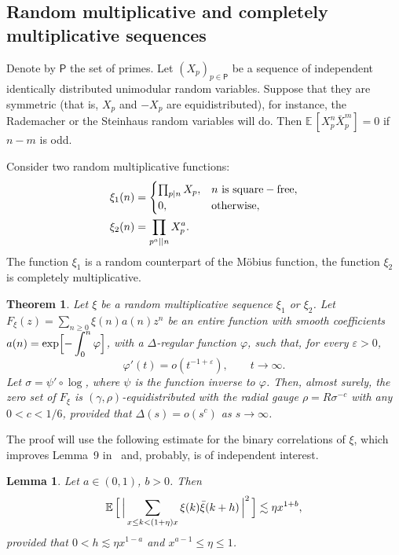 \documentclass[11pt]{amsart}
\numberwithin{equation}{section}
\newtheorem{theorem}{Theorem}
\newtheorem{lemma}{Lemma}[section]
\def\ep{{\varepsilon}}
\newcommand{\bE}{\mathbb E}
\begin{document}
\subsection{Random multiplicative and completely multiplicative sequen\-ces}

Denote by $\mathsf P$ the set of primes.
Let $(X_p)_{p\in\mathsf P}$ be a sequence of independent identically distributed
unimodular random variables. Suppose that they are symmetric (that is,
$X_p$ and $-X_p$ are equidistributed), for instance, the Rademacher or the Steinhaus random variables will do. Then $\bE\,[X_p^n\bar X_p^m]=0$ if $n-m$ is odd.

Consider two random multiplicative functions:
\begin{align*}
\xi_1(n)&=
\begin{cases}
\prod_{p|n}X_p, & n {\rm\ is\ square-free},\\
0, & {\rm otherwise},
\end{cases} \\
\xi_2(n)&=\prod_{p^a||n}X^a_p.
\end{align*}
The function $\xi_1$ is a random counterpart of the M\"obius function,
the function $\xi_2$ is completely multiplicative.

\begin{theorem}\label{thm:random-multiplicative}
Let $\xi$ be a random multiplicative sequence $\xi_1$ or $\xi_2$.
Let $F_\xi (z) = \sum_{n\ge 0} \xi(n) a(n) z^n $ be an entire function with smooth
coefficients $a(n) = \exp\Bigl[ -\displaystyle \int_0^n \varphi \Bigr]$, with
a $\Delta$-regular function $\varphi$, such that, for every $\ep>0$,
\begin{equation}\label{eq:phi'}
\varphi'(t) = o(t^{-1+\ep}), \qquad t\to\infty.
\end{equation}
Let $\sigma=\psi'\circ\log$,
where $\psi$ is the function inverse to $\varphi$.
Then, almost surely,
the zero set of $F_\xi$ is $(\gamma, \rho)$-equidistributed with the radial gauge $\rho=R\sigma^{-c}$
with any $0<c<1/6$, provided that $\Delta(s) = o(s^c)$ as $s\to\infty$.
\end{theorem}

The proof will use the following estimate for the binary correlations of $\xi$,
which improves Lemma~9 in~\cite{BBS} and, probably, is of independent
interest.

\begin{lemma} \label{lem10q}
Let $a\in(0,1)$, $b>0$. Then
$$
\mathbb E\,\Bigl[\,
\Bigl|\, \sum_{x\le k< (1+\eta)x}\xi(k)\bar\xi(k+h)\, \Bigr|^2\, \Bigr]
\lesssim \eta x^{1+b},
$$
provided that $0<h\lesssim \eta x^{1-a}$ and $x^{a-1}\le\eta\le 1$.
\end{lemma}
\end{document}
